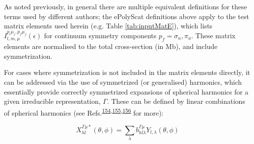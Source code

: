 \documentclass[10pt]{article}
\begin{document}
As noted previously, in general there are multiple equivalent definitions for these terms used by different authors; the ePolyScat definitions above apply to the test matrix elements used herein (e.g. Table \ref{tab:inputMatE}), which lists $I_{l,m,\mu}^{p_{i}\mu_{i},p_{f}\mu_{f}}(\epsilon)$ for continuum symmetry components $p_f=\sigma_u,\pi_u$. These matrix elements are normalised to the total cross-section (in Mb), and include symmetrization. 



For cases where symmetrization is not included in the matrix elements directly, it can be addressed via the use of symmetrized (or generalised) harmonics, which essentially provide correctly symmetrized expansions of spherical harmonics for a given irreducible representation, $\Gamma$. These can be defined by linear combinations of spherical harmonics (see Refs.\textsuperscript{\hyperref[csl:154]{154},\hyperref[csl:155]{155},\hyperref[csl:156]{156}} for more):

\begin{equation}
X_{hl}^{\Gamma\mu*}(\theta,\phi)=\sum_{\lambda}b_{hl\lambda}^{\Gamma\mu}Y_{l,\lambda}(\theta,\phi)\label{eq:symm-harmonics}
\end{equation}
\end{document}
